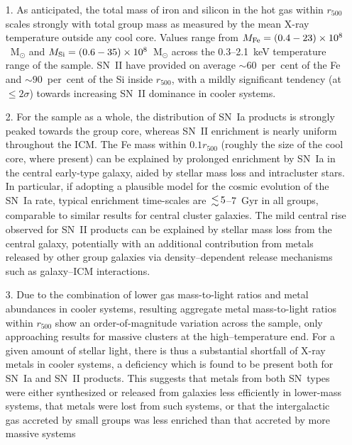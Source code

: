 \documentclass[useAMS,usenatbib]{mn2e}
\begin{document}
\begin{enumerate}

\item[1.] As anticipated, the total mass of iron and silicon in the
  hot gas within $r_{500}$ scales strongly with total group mass as
  measured by the mean X-ray temperature outside any cool core. Values
  range from $M_{\rm Fe}=(0.4-23) \times 10^8$~M$_\odot$ and $M_{\rm
  Si}=(0.6-35) \times 10^8$~M$_\odot$ across the 0.3--2.1~keV
  temperature range of the sample. SN~II have provided on average
  $\sim 60$~per~cent of the Fe and $\sim 90$~per~cent of the Si inside
  $r_{500}$, with a mildly significant tendency (at $\leq 2\sigma$)
  towards increasing SN~II dominance in cooler systems.

\item[2.] For the sample as a whole, the distribution of SN~Ia
  products is strongly peaked towards the group core, whereas SN~II
  enrichment is nearly uniform throughout the ICM. The Fe mass within
  $0.1r_{500}$ (roughly the size of the cool core, where present) can
  be explained by prolonged enrichment by SN~Ia in the central
  early-type galaxy, aided by stellar mass loss and intracluster
  stars. In particular, if adopting a plausible model for the cosmic
  evolution of the SN~Ia rate, typical enrichment time-scales are $\la
  5$--7~Gyr in all groups, comparable to similar results for central
  cluster galaxies. The mild central rise observed for SN~II products
  can be explained by stellar mass loss from the central galaxy,
  potentially with an additional contribution from metals released by
  other group galaxies via density--dependent release mechanisms such
  as galaxy--ICM interactions.
  
\item[3.] Due to the combination of lower gas mass-to-light ratios and
  metal abundances in cooler systems, resulting aggregate metal
  mass-to-light ratios within $r_{500}$ show an order-of-magnitude
  variation across the sample, only approaching results for massive
  clusters at the high--temperature end. For a given amount of stellar
  light, there is thus a substantial shortfall of X-ray metals in
  cooler systems, a deficiency which is found to be present both for
  SN~Ia and SN~II products. This suggests that metals from both
  SN~types were either synthesized or released from galaxies less
  efficiently in lower-mass systems, that metals were lost from such
  systems, or that the intergalactic gas accreted by small groups was
  less enriched than that accreted by more massive systems


\end{enumerate}
\end{document}
